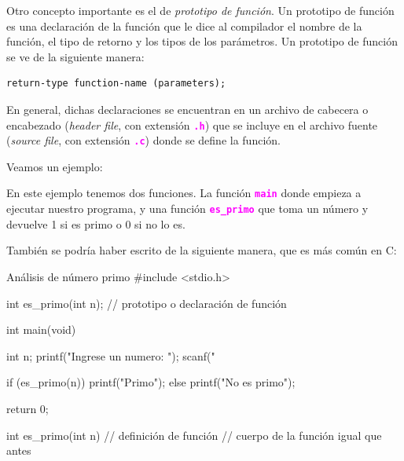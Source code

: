 \documentclass[]{scrartcl}
\newcommand{\hl}[1]{\textcolor{magenta}{\textbf{\texttt{#1}}}}
\begin{document}
Otro concepto importante es el de \textit{prototipo de función}. Un prototipo de función es una declaración de la función que le dice al compilador el nombre de la función, el tipo de retorno y los tipos de los parámetros. Un prototipo de función se ve de la siguiente manera:

\begin{center}
  \begin{Verbatim}[fontshape=it]
  return-type function-name (parameters);
  \end{Verbatim}
\end{center}

En general, dichas declaraciones se encuentran en un archivo de cabecera o encabezado (\textit{header file}, con extensión \hl{.h}) que se incluye en el archivo fuente (\textit{source file}, con extensión \hl{.c}) donde se define la función.

Veamos un ejemplo:

En este ejemplo tenemos dos funciones. La función \hl{main} donde empieza a ejecutar nuestro programa, y una función \hl{es\_primo} que toma un número y devuelve 1 si es primo o 0 si no lo es.

También se podría haber escrito de la siguiente manera, que es más común en C:

\begin{cbox}[]{Análisis de número primo}
  #include <stdio.h>
  
  int es_primo(int n);    // prototipo o declaración de función

  int main(void) {
    int n;
    printf("Ingrese un numero: ");
    scanf("%
            
    if (es_primo(n)) {
      printf("Primo\n");
    } else {
      printf("No es primo\n");
    }
                
    return 0;
  }

  int es_primo(int n) {     // definición de función
    // cuerpo de la función igual que antes
  }

\end{cbox}
\end{document}

